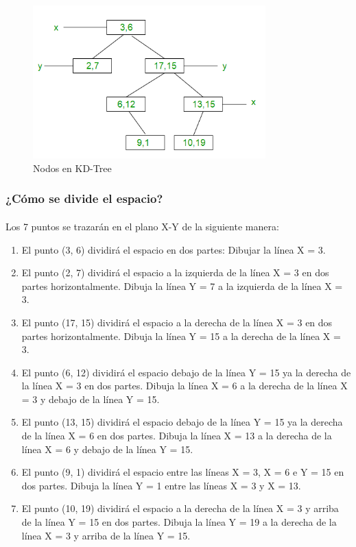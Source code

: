 \documentclass{article}
\begin{document}
\begin{figure}[h!]
	\centering
	\includegraphics[width=0.8\textwidth]{img/kdtree_1.png}
	\caption{Nodos en KD-Tree}
	\label{fig:kdtree_01}
\end{figure}

\subsubsection{¿Cómo se divide el espacio?}
\paragraph{}
Los 7 puntos se trazarán en el plano X-Y de la siguiente manera:

\begin{enumerate}
	\item El punto (3, 6) dividirá el espacio en dos partes: Dibujar la línea X = 3.
	\item El punto (2, 7) dividirá el espacio a la izquierda de la línea X = 3 en dos partes horizontalmente. Dibuja la línea Y = 7 a la izquierda de la línea X = 3.
	\item El punto (17, 15) dividirá el espacio a la derecha de la línea X = 3 en dos partes horizontalmente. Dibuja la línea Y = 15 a la derecha de la línea X = 3.
	\item El punto (6, 12) dividirá el espacio debajo de la línea Y = 15 ya la derecha de la línea X = 3 en dos partes. Dibuja la línea X = 6 a la derecha de la línea X = 3 y debajo de la línea Y = 15.
	\item El punto (13, 15) dividirá el espacio debajo de la línea Y = 15 ya la derecha de la línea X = 6 en dos partes. Dibuja la línea X = 13 a la derecha de la línea X = 6 y debajo de la línea Y = 15.
	\item El punto (9, 1) dividirá el espacio entre las líneas X = 3, X = 6 e Y = 15 en dos partes. Dibuja la línea Y = 1 entre las líneas X = 3 y X = 13.
	\item El punto (10, 19) dividirá el espacio a la derecha de la línea X = 3 y arriba de la línea Y = 15 en dos partes. Dibuja la línea Y = 19 a la derecha de la línea X = 3 y arriba de la línea Y = 15.
\end{enumerate}
\end{document}
